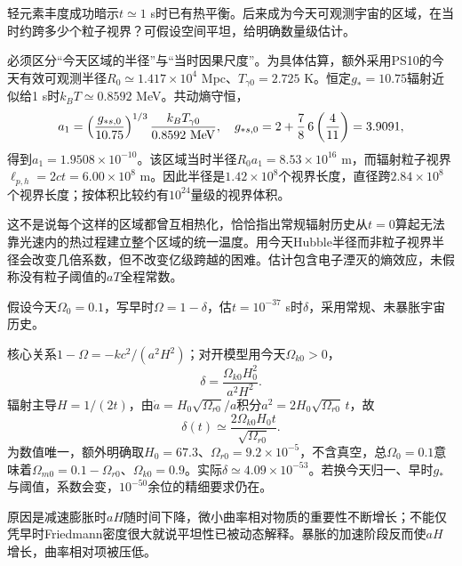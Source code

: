 \begin{exercise}
轻元素丰度成功暗示$t\simeq1$ s时已有热平衡。后来成为今天可观测宇宙的区域，在当时约跨多少个粒子视界？可假设空间平坦，给明确数量级估计。
\end{exercise}
\begin{solution}
必须区分“今天区域的半径”与“当时因果尺度”。为具体估算，额外采用PS10的今天有效可观测半径$R_0\simeq1.417\times10^4$ Mpc、$T_{\gamma0}=2.725$ K。恒定$g_*=10.75$辐射近似给1 s时$k_BT\simeq0.8592$ MeV。共动熵守恒，
\[
 a_1=\left(\frac{g_{*s,0}}{10.75}\right)^{1/3}
 \frac{k_BT_{\gamma0}}{0.8592\ {\rm MeV}},\quad
 g_{*s,0}=2+\frac78\,6\left(\frac4{11}\right)=3.9091,
\]
得到$a_1=1.9508\times10^{-10}$。该区域当时半径$R_0a_1=8.53\times10^{16}$ m，而辐射粒子视界$\ell_{p,h}=2ct=6.00\times10^8$ m。因此半径是$1.42\times10^8$个视界长度，直径跨$2.84\times10^8$个视界长度；按体积比较约有$10^{24}$量级的视界体积。

这不是说每个这样的区域都曾互相热化，恰恰指出常规辐射历史从$t=0$算起无法靠光速内的热过程建立整个区域的统一温度。用今天Hubble半径而非粒子视界半径会改变几倍系数，但不改变亿级跨越的困难。估计包含电子湮灭的熵效应，未假称没有粒子阈值的$aT$全程常数。
\end{solution}

\begin{exercise}
假设今天$\Omega_0=0.1$，写早时$\Omega=1-\delta$，估$t=10^{-37}$ s时$\delta$，采用常规、未暴胀宇宙历史。
\end{exercise}
\begin{solution}
核心关系$1-\Omega=-kc^2/(a^2H^2)$；对开模型用今天$\Omega_{k0}>0$，
\[
 \delta=\frac{\Omega_{k0}H_0^2}{a^2H^2}.
\]
辐射主导$H=1/(2t)$，由$\dot a=H_0\sqrt{\Omega_{r0}}/a$积分$a^2=2H_0\sqrt{\Omega_{r0}}\,t$，故
\[
 \delta(t)\simeq\frac{2\Omega_{k0}H_0t}{\sqrt{\Omega_{r0}}}.
\]
为数值唯一，额外明确取$H_0=67.3$、$\Omega_{r0}=9.2\times10^{-5}$，不含真空，总$\Omega_0=0.1$意味着$\Omega_{m0}=0.1-\Omega_{r0}$、$\Omega_{k0}=0.9$。实际$\delta\simeq4.09\times10^{-53}$。若换今天归一、早时$g_*$与阈值，系数会变，$10^{-50}$余位的精细要求仍在。

原因是减速膨胀时$aH$随时间下降，微小曲率相对物质的重要性不断增长；不能仅凭早时Friedmann密度很大就说平坦性已被动态解释。暴胀的加速阶段反而使$aH$增长，曲率相对项被压低。
\end{solution}

